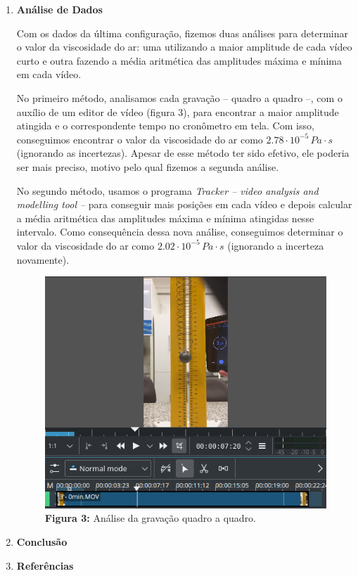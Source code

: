 \documentclass[a4paper, 12pt]{article}
\begin{document}
\begin{multicols}{2}
\begin{enumerate}
		\item \textbf{Análise de Dados}
			\setlength{\parindent}{4ex}
			\par Com os dados da última configuração, fizemos duas análises para determinar o valor da viscosidade do ar: uma utilizando a maior amplitude de cada vídeo curto e outra fazendo a média aritmética das amplitudes máxima e mínima em cada vídeo.
			\par No primeiro método, analisamos cada gravação -- quadro a quadro --, com o auxílio de um editor de vídeo (figura 3), para encontrar a maior amplitude atingida e o correspondente tempo no cronômetro em tela. Com isso, conseguimos encontrar o valor da viscosidade do ar como $2.78 \cdot 10^{-5} \, Pa \cdot s$ (ignorando as incertezas). Apesar de esse método ter sido efetivo, ele poderia ser mais preciso, motivo pelo qual fizemos a segunda análise.
			\par No segundo método, usamos o programa \textit{Tracker -- video analysis and modelling tool --} para conseguir mais posições em cada vídeo e depois calcular a média aritmética das amplitudes máxima e mínima atingidas nesse intervalo. Como consequência dessa nova análise, conseguimos determinar o valor da viscosidade do ar como $2.02 \cdot 10^{-5} \, Pa \cdot s$ (ignorando a incerteza novamente).
			\begin{figure}[H]
				\centering
				\includegraphics[scale=0.4]{./img/quadros.png}
				\captionsetup{labelformat=empty}
				\caption{\textbf{Figura 3:} Análise da gravação quadro a quadro.}
			\end{figure}
			
		\item \textbf{Conclusão}
		
		\item \textbf{Referências}
		
	\end{enumerate} \end{multicols}
\end{document}
